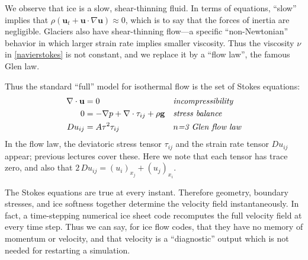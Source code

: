 \documentclass[titlepage,letterpaper,final,12pt]{scrartcl}
\begin{document}
We observe that ice is a slow, shear-thinning fluid.  In terms of equations, ``slow'' implies that $\rho \left(\mathbf{u}_t + \mathbf{u}\cdot\nabla \mathbf{u}\right) \approx 0$, which is to say that the forces of inertia are negligible.  Glaciers also have shear-thinning flow---a specific ``non-Newtonian'' behavior in which larger strain rate implies smaller viscosity.  Thus the viscosity $\nu$ in \eqref{navierstokes} is not constant, and we replace it by a ``flow law'', the famous Glen law.

Thus the standard ``full'' model for isothermal flow is the set of Stokes equations:
\begin{align}
\nabla \cdot \mathbf{u} &= 0 &&\text{\emph{incompressibility}} \label{incompressibleagain} \\
0 &= - \nabla p + \nabla \cdot \tau_{ij} + \rho \mathbf{g} &&\text{\emph{stress balance}} \label{forcebalance} \\
Du_{ij} &= A \tau^2 \tau_{ij} &&\text{\emph{$n$=3 Glen flow law}} \label{flowlaw}
\end{align}
In the flow law, the deviatoric stress tensor $\tau_{ij}$ and the strain rate tensor $Du_{ij}$ appear; previous lectures cover these.  Here we note that each tensor has trace zero, and also that $2\,Du_{ij} = (u_i)_{x_j}+(u_j)_{x_i}$.

The Stokes equations are true at every instant.  Therefore geometry, boundary stresses, and ice softness together determine the velocity field instantaneously.  In fact, a time-stepping numerical ice sheet code recomputes the full velocity field at every time step.  Thus we can say, for ice flow codes, that they have no memory of momentum or velocity, and that velocity is a ``diagnostic'' output which is not needed for restarting a simulation.
\end{document}
